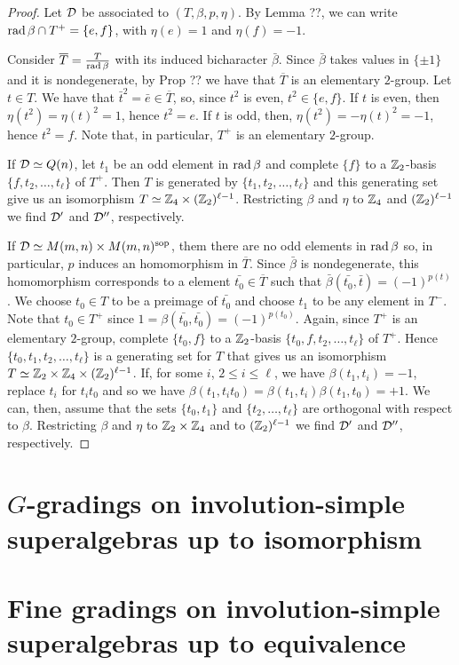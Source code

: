 \begin{proof}
    Let $\mathcal{D}$ be associated to $(T, \beta, p, \eta)$. 
    By Lemma ??, we can write $\operatorname{rad} \beta \cap T^+ = \{ e, f\}$, with $\eta(e) = 1$ and $\eta(f) = -1$. 
    
    Consider $\overline{T} = \frac{T}{\operatorname{rad} \beta}$ with its induced bicharacter $\bar \beta$. 
    Since $\bar\beta$ takes values in $\{\pm 1\}$ and it is nondegenerate, by Prop ?? we have that $\overline{T}$ is an elementary $2$-group. 
    Let $t\in T$. 
    We have that $\bar t^2 = \bar e \in \overline{T}$, so, since $t^2$ is even, $t^2 \in \{ e, f \}$. 
    If $t$ is even, then $\eta(t^2) = \eta(t)^2 = 1$, hence $t^2 = e$. 
    If $t$ is odd, then, $\eta(t^2) = -\eta(t)^2 = -1$, hence $t^2 = f$. 
    Note that, in particular, $T^+$ is an elementary $2$-group.
    
    If $\mathcal{D} \simeq Q(n)$, let $t_1$ be an odd element in $\operatorname{rad} \beta$ and complete $\{f\}$ to a $\mathbb{Z}_2$-basis $\{f, t_2, \ldots, t_\ell \}$ of $T^+$. 
    Then $T$ is generated by $\{t_1, t_2, \ldots, t_\ell \}$ and this generating set give us an isomorphism $T \simeq \mathbb{Z}_4 \times (\mathbb{Z}_2)^{\ell - 1}$. 
    Restricting $\beta$ and $\eta$ to $\mathbb{Z}_4$ and $(\mathbb{Z}_2)^{\ell - 1}$ we find $\mathcal{D}'$ and $\mathcal{D}''$, respectively.
    
    If $\mathcal{D} \simeq M(m,n) \times M(m,n)^{\mathrm{sop}}$, them there are no odd elements in $\operatorname{rad} \beta$ so, in particular, $p$ induces an homomorphism in $\overline{T}$. 
    Since $\bar \beta$ is nondegenerate, this homomorphism corresponds to a element $\bar {t_0} \in \overline T$ such that $\bar \beta (\bar {t_0}, \bar t) = (-1)^{p(t)}$. 
    We choose $t_0 \in T$ to be a preimage of $\bar {t_0}$ and choose $t_1$ to be any element in $T^-$. 
    Note that $t_0 \in T^+$ since $1 = \beta(\bar {t_0}, \bar {t_0}) = (-1)^{p(t_0)}$. 
    Again, since $T^+$ is an elementary $2$-group, complete $\{t_0, f\}$ to a $\mathbb{Z}_2$-basis $\{ t_0, f, t_2, \ldots, t_\ell \}$ of $T^+$. 
    Hence $\{ t_0, t_1, t_2, \ldots, t_\ell \}$ is a generating set for $T$ that gives us an isomorphism $T \simeq \mathbb{Z}_2 \times \mathbb{Z}_4 \times (\mathbb{Z}_2)^{\ell - 1}$. 
    If, for some $i$, $2 \leq i \leq \ell$, we have $\beta(t_1, t_i)= -1$, replace $t_i$ for $t_it_0$ and so we have $\beta(t_1, t_it_0) = \beta(t_1, t_i) \beta(t_1, t_0) = +1$. 
    We can, then, assume that the sets $\{ t_0, t_1 \}$ and $\{ t_2, \ldots, t_\ell \}$ are orthogonal with respect to $\beta$.
    Restricting $\beta$ and $\eta$ to $\mathbb{Z}_2 \times \mathbb{Z}_4$ and to $(\mathbb{Z}_2)^{\ell - 1}$ we find $\mathcal{D}'$ and $\mathcal{D}''$, respectively.
\end{proof}

\section{$G$-gradings on involution-simple superalgebras up to isomorphism}

\section{Fine gradings on involution-simple superalgebras up to equivalence}
